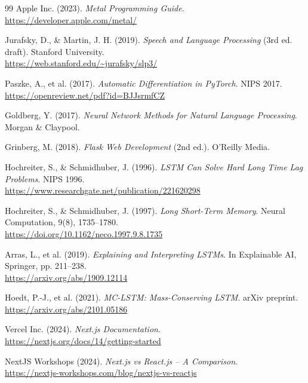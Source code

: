 \begin{thebibliography}{99}
Apple Inc. (2023).
\textit{Metal Programming Guide}.\\
\url{https://developer.apple.com/metal/}


Jurafsky, D., \& Martin, J. H. (2019).
\textit{Speech and Language Processing} (3rd ed. draft). Stanford University.\\
\url{https://web.stanford.edu/~jurafsky/slp3/}

Paszke, A., et al. (2017).
\textit{Automatic Differentiation in PyTorch}. NIPS 2017.\\
\url{https://openreview.net/pdf?id=BJJsrmfCZ}

Goldberg, Y. (2017).
\textit{Neural Network Methods for Natural Language Processing}. Morgan \& Claypool.

Grinberg, M. (2018).
\textit{Flask Web Development} (2nd ed.). O'Reilly Media.


Hochreiter, S., \& Schmidhuber, J. (1996).
\textit{LSTM Can Solve Hard Long Time Lag Problems}. NIPS 1996.\\
\url{https://www.researchgate.net/publication/221620298}

Hochreiter, S., \& Schmidhuber, J. (1997).
\textit{Long Short-Term Memory}. Neural Computation, 9(8), 1735--1780.\\
\url{https://doi.org/10.1162/neco.1997.9.8.1735}

Arras, L., et al. (2019).
\textit{Explaining and Interpreting LSTMs}. In Explainable AI, Springer, pp. 211--238.\\
\url{https://arxiv.org/abs/1909.12114}

Hoedt, P.-J., et al. (2021).
\textit{MC-LSTM: Mass-Conserving LSTM}. arXiv preprint.\\
\url{https://arxiv.org/abs/2101.05186}


Vercel Inc. (2024).
\textit{Next.js Documentation}.\\
\url{https://nextjs.org/docs/14/getting-started}

NextJS Workshops (2024).
\textit{Next.js vs React.js -- A Comparison}.\\
\url{https://nextjs-workshops.com/blog/nextjs-vs-reactjs}


\end{thebibliography}
